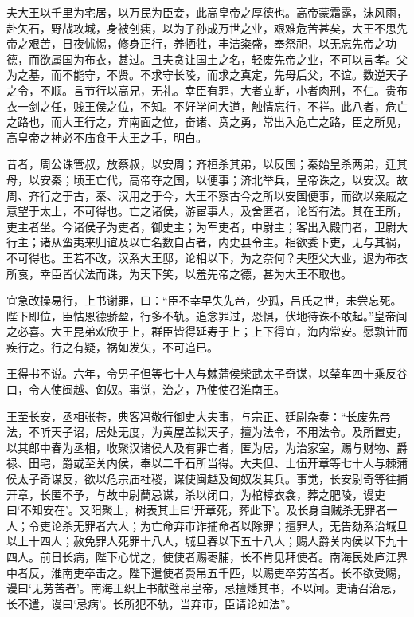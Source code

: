 \documentclass[12pt,UTF8]{ctexbook}
\begin{document}
夫大王以千里为宅居，以万民为臣妾，此高皇帝之厚德也。高帝蒙霜露，沫风雨，赴矢石，野战攻城，身被创痍，以为子孙成万世之业，艰难危苦甚矣，大王不思先帝之艰苦，日夜怵惕，修身正行，养牺牲，丰洁粢盛，奉祭祀，以无忘先帝之功德，而欲属国为布衣，甚过。且夫贪让国土之名，轻废先帝之业，不可以言孝。父为之基，而不能守，不贤。不求守长陵，而求之真定，先母后父，不谊。数逆天子之令，不顺。言节行以高兄，无礼。幸臣有罪，大者立断，小者肉刑，不仁。贵布衣一剑之任，贱王侯之位，不知。不好学问大道，触情忘行，不祥。此八者，危亡之路也，而大王行之，弃南面之位，奋诸、贲之勇，常出入危亡之路，臣之所见，高皇帝之神必不庙食于大王之手，明白。



昔者，周公诛管叔，放蔡叔，以安周；齐桓杀其弟，以反国；秦始皇杀两弟，迁其母，以安秦；顷王亡代，高帝夺之国，以便事；济北举兵，皇帝诛之，以安汉。故周、齐行之于古，秦、汉用之于今，大王不察古今之所以安国便事，而欲以亲戚之意望于太上，不可得也。亡之诸侯，游宦事人，及舍匿者，论皆有法。其在王所，吏主者坐。今诸侯子为吏者，御史主；为军吏者，中尉主；客出入殿门者，卫尉大行主；诸从蛮夷来归谊及以亡名数自占者，内史县令主。相欲委下吏，无与其祸，不可得也。王若不改，汉系大王邸，论相以下，为之奈何？夫堕父大业，退为布衣所哀，幸臣皆伏法而诛，为天下笑，以羞先帝之德，甚为大王不取也。



宜急改操易行，上书谢罪，曰：“臣不幸早失先帝，少孤，吕氏之世，未尝忘死。陛下即位，臣怙恩德骄盈，行多不轨。追念罪过，恐惧，伏地待诛不敢起。”皇帝闻之必喜。大王昆弟欢欣于上，群臣皆得延寿于上；上下得宜，海内常安。愿孰计而疾行之。行之有疑，祸如发矢，不可追已。



王得书不说。六年，令男子但等七十人与棘蒲侯柴武太子奇谋，以辇车四十乘反谷口，令人使闽越、匈奴。事觉，治之，乃使使召淮南王。



王至长安，丞相张苍，典客冯敬行御史大夫事，与宗正、廷尉杂奏：“长废先帝法，不听天子诏，居处无度，为黄屋盖拟天子，擅为法令，不用法令。及所置吏，以其郎中春为丞相，收聚汉诸侯人及有罪亡者，匿为居，为治家室，赐与财物、爵禄、田宅，爵或至关内侯，奉以二千石所当得。大夫但、士伍开章等七十人与棘蒲侯太子奇谋反，欲以危宗庙社稷，谋使闽越及匈奴发其兵。事觉，长安尉奇等往捕开章，长匿不予，与故中尉蕳忌谋，杀以闭口，为棺椁衣衾，葬之肥陵，谩吏曰‘不知安在’。又阳聚土，树表其上曰‘开章死，葬此下’。及长身自贼杀无罪者一人；令吏论杀无罪者六人；为亡命弃市诈捕命者以除罪；擅罪人，无告劾系治城旦以上十四人；赦免罪人死罪十八人，城旦春以下五十八人；赐人爵关内侯以下九十四人。前日长病，陛下心忧之，使使者赐枣脯，长不肯见拜使者。南海民处庐江界中者反，淮南吏卒击之。陛下遣使者赍帛五千匹，以赐吏卒劳苦者。长不欲受赐，谩曰‘无劳苦者’。南海王织上书献璧帛皇帝，忌擅燔其书，不以闻。吏请召治忌，长不遣，谩曰‘忌病’。长所犯不轨，当弃市，臣请论如法”。
\end{document}
